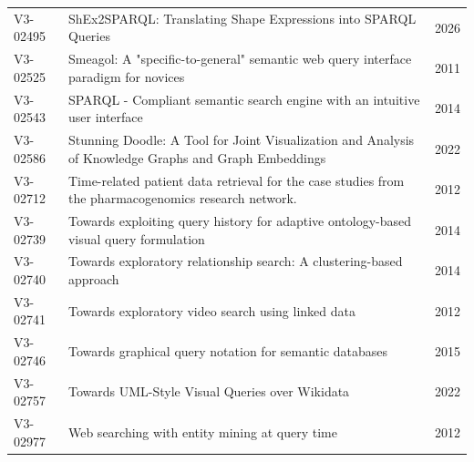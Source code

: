 \documentclass[manuscript,review,screen]{acmart}
\begin{document}
\begin{longtable}{@{}L{21mm}L{107mm}L{17mm}@{}}
V3-02495 & ShEx2SPARQL: Translating Shape Expressions into SPARQL Queries & 2026 \citep{V3-02495}\\
V3-02525 & Smeagol: A "specific-to-general" semantic web query interface paradigm for novices & 2011 \citep{V3-02525}\\
V3-02543 & SPARQL - Compliant semantic search engine with an intuitive user interface & 2014 \citep{V3-02543}\\
V3-02586 & Stunning Doodle: A Tool for Joint Visualization and Analysis of Knowledge Graphs and Graph Embeddings & 2022 \citep{V3-02586}\\
V3-02712 & Time-related patient data retrieval for the case studies from the pharmacogenomics research network. & 2012 \citep{V3-02712}\\
V3-02739 & Towards exploiting query history for adaptive ontology-based visual query formulation & 2014 \citep{V3-02739}\\
V3-02740 & Towards exploratory relationship search: A clustering-based approach & 2014 \citep{V3-02740}\\
V3-02741 & Towards exploratory video search using linked data & 2012 \citep{V3-02741}\\
V3-02746 & Towards graphical query notation for semantic databases & 2015 \citep{V3-02746}\\
V3-02757 & Towards UML-Style Visual Queries over Wikidata & 2022 \citep{V3-02757}\\
V3-02977 & Web searching with entity mining at query time & 2012 \citep{V3-02977}\\
\end{longtable}
\end{document}
